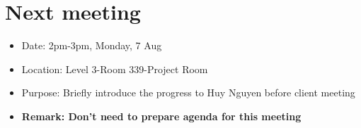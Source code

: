 \documentclass[11pt, a4paper]{article}
\begin{document}


\section{Next meeting}
\begin{itemize}
\item Date: 2pm-3pm, Monday, 7 Aug
\item Location: Level 3-Room 339-Project Room
\item Purpose: Briefly introduce the progress to Huy Nguyen before client meeting
\item \bf Remark: Don't need to prepare agenda for this meeting
\end{itemize}

\vspace*{10pt}
\end{document}
